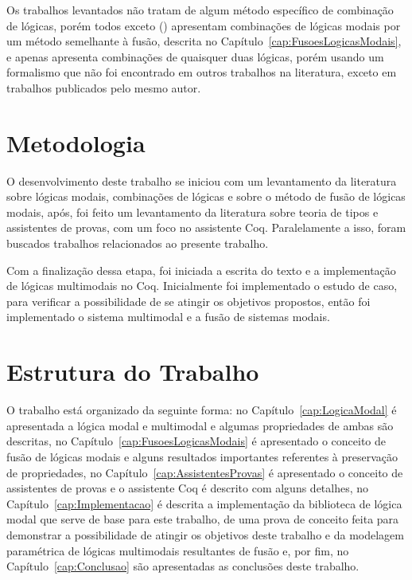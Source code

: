 		Os trabalhos levantados não tratam de algum método específico de combinação de lógicas, porém todos exceto  (\citeyear{rabe2017identify})
		apresentam combinações de lógicas modais por um método semelhante à fusão, descrita no Capítulo~\ref{cap:FusoesLogicasModais}, e apenas 
		apresenta combinações de quaisquer duas lógicas, porém usando um formalismo que não foi encontrado em outros trabalhos na literatura, exceto em trabalhos
		publicados pelo mesmo autor.

	\section{Metodologia}
		O desenvolvimento deste trabalho se iniciou com um levantamento da literatura sobre lógicas modais, combinações de lógicas e sobre o método de fusão de lógicas modais,
		após, foi feito um levantamento da literatura sobre teoria de tipos e assistentes de provas, com um foco no assistente Coq. Paralelamente a isso, foram buscados trabalhos
		relacionados ao presente trabalho.

		Com a finalização dessa etapa, foi iniciada a escrita do texto e a implementação de lógicas multimodais no Coq. Inicialmente foi implementado o estudo de caso, para verificar
		a possibilidade de se atingir os objetivos propostos, então foi implementado o sistema multimodal e a fusão de sistemas modais.

	\section{Estrutura do Trabalho}
		O trabalho está organizado da seguinte forma: no Capítulo~\ref{cap:LogicaModal} é apresentada a lógica modal e multimodal e algumas propriedades de ambas
		são descritas, no Capítulo~\ref{cap:FusoesLogicasModais} é apresentado o conceito de fusão de lógicas modais e alguns resultados importantes referentes à preservação
		de propriedades, no Capítulo~\ref{cap:AssistentesProvas} é apresentado o conceito de assistentes de provas e o assistente Coq é descrito com alguns detalhes,
		no Capítulo~\ref{cap:Implementacao} é descrita a implementação da biblioteca de lógica modal que serve de base para este trabalho, de uma prova de conceito feita para
		demonstrar a possibilidade de atingir os objetivos deste trabalho e da modelagem paramétrica de lógicas multimodais resultantes de fusão e, por fim,
		no Capítulo~\ref{cap:Conclusao} são apresentadas as conclusões deste trabalho.